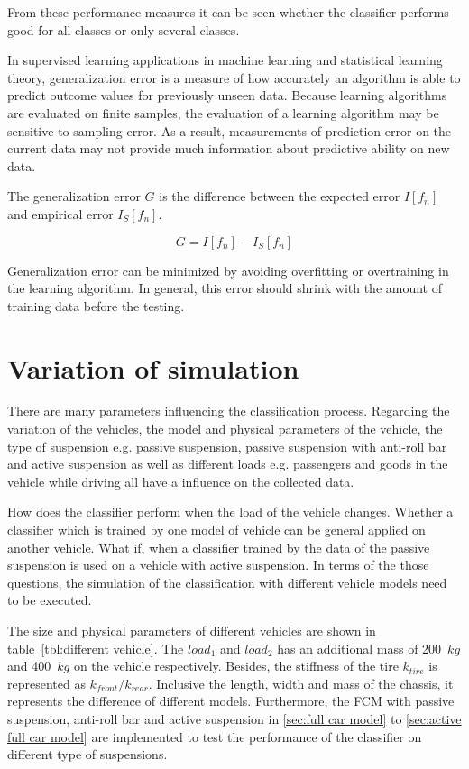 From these performance measures it can be seen whether the classifier performs good for all classes or only several classes.

In supervised learning applications in machine learning and statistical learning theory, generalization error is a measure of how accurately an algorithm is able to predict outcome values for previously unseen data.
%
Because learning algorithms are evaluated on finite samples, the evaluation of a learning algorithm may be sensitive to sampling error.
%
As a result, measurements of prediction error on the current data may not provide much information about predictive ability on new data.
 
The generalization error $G$ is the difference between the expected error $I[f_n]$ and empirical error $I_S[f_n]$.
 
 \begin{equation}
    G=I[f_n]-I_S[f_n]
 \end{equation}
 
 Generalization error can be minimized by avoiding overfitting or overtraining in the learning algorithm.
 In general, this error should shrink with the amount of training data before the testing.
 
 
 
 
 \section{Variation of simulation}
 
 There are many parameters influencing the classification process.
 Regarding the variation of the vehicles, the model and physical parameters of the vehicle, the type of suspension e.g. passive suspension, passive suspension with anti-roll bar and active suspension as well as different loads e.g. passengers and goods in the vehicle while driving all have a influence on the collected data.
 
 How does the classifier perform when the load of the vehicle changes.
 Whether a classifier which is trained by one model of vehicle can be general applied on another vehicle.
 What if, when a classifier trained by the data of the passive suspension is used on a vehicle with active suspension.
 In terms of the those questions, the simulation of the classification with different vehicle models need to be executed.
 
 The size and physical parameters of different vehicles are shown in table~\ref{tbl:different vehicle}.
 The $load_1$ and $load_2$ has an additional mass of 200~$kg$ and 400~$kg$ on the vehicle respectively.
 Besides, the stiffness of the tire $k_{tire}$ is represented as $k_{front}/k_{rear}$.
 Inclusive the length, width and mass of the chassis, it represents the difference of different models.
 Furthermore, the \ac{FCM} with passive suspension, anti-roll bar and active suspension in \ref{sec:full car model} to \ref{sec:active full car model} are implemented to test the performance of the classifier on different type of suspensions.
 
